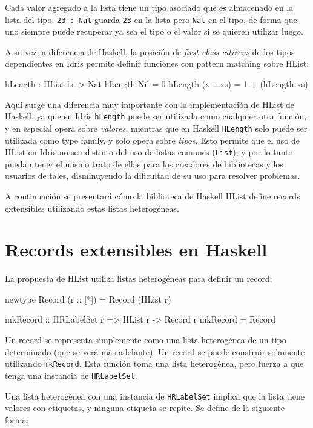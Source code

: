 Cada valor agregado a la lista tiene un tipo asociado que es almacenado en la lista del tipo. \texttt{23 : Nat} guarda \texttt{23} en la lista pero \texttt{Nat} en el tipo, de forma que uno siempre puede recuperar ya sea el tipo o el valor si se quieren utilizar luego.

A su vez, a diferencia de Haskell, la posición de \textit{first-class citizens} de los tipos dependientes en Idris permite definir funciones con pattern matching sobre HList:

\begin{code}
hLength : HList ls -> Nat
hLength Nil = 0
hLength (x :: xs) = 1 + (hLength xs)
\end{code}

Aquí surge una diferencia muy importante con la implementación de HList de Haskell, ya que en Idris \texttt{hLength} puede ser utilizada como cualquier otra función, y en especial opera sobre \textit{valores}, mientras que en Haskell \texttt{HLength} solo puede ser utilizada como type family, y solo opera sobre \textit{tipos}. Esto permite que el uso de HList en Idris no sea distinto del uso de listas comunes (\texttt{List}), y por lo tanto puedan tener el mismo trato de ellas para los creadores de bibliotecas y los usuarios de tales, disminuyendo la dificultad de su uso para resolver problemas.

A continuación se presentará cómo la biblioteca de Haskell HList define records extensibles utilizando estas listas heterogéneas.

\section{Records extensibles en Haskell}

La propuesta de HList \cite{Kiselyov:2004:STH:1017472.1017488} utiliza listas heterogéneas para definir un record:

\begin{code}
newtype Record (r :: [*]) = Record (HList r)

mkRecord :: HRLabelSet r => HList r -> Record r
mkRecord = Record
\end{code}

Un record se representa simplemente como una lista heterogénea de un tipo determinado (que se verá más adelante). Un record se puede construir solamente utilizando \texttt{mkRecord}. Esta función toma una lista heterogénea, pero fuerza a que tenga una instancia de \texttt{HRLabelSet}.

Una lista heterogénea con una instancia de \texttt{HRLabelSet} implica que la lista tiene valores con etiquetas, y ninguna etiqueta se repite. Se define de la siguiente forma:

